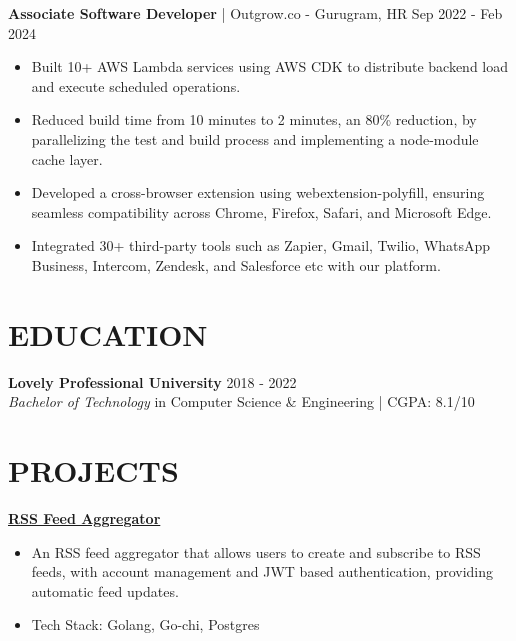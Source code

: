 \documentclass[]{resume}
\begin{document}
\textbf{Associate Software Developer} | Outgrow.co - Gurugram, HR \hfill Sep 2022 - Feb 2024
\begin{itemize}
    \item Built 10+ AWS Lambda services using AWS CDK to distribute backend load and execute scheduled operations.
    \item Reduced build time from 10 minutes to 2 minutes, an 80\% reduction, by parallelizing the test and build process and implementing a node-module cache layer.
    \item Developed a cross-browser extension using webextension-polyfill, ensuring seamless compatibility across Chrome, Firefox, Safari, and Microsoft Edge.
    \item Integrated 30+ third-party tools such as Zapier, Gmail, Twilio, WhatsApp Business, Intercom, Zendesk, and Salesforce etc with our platform.
\end{itemize}

\section{EDUCATION}
\textbf{Lovely Professional University}  \hfill 2018 - 2022 \\
\textit{Bachelor of Technology} in Computer Science \& Engineering | CGPA: 8.1/10

\section{PROJECTS}
\href{https://github.com/saswatax/rss-aggregator}{\textbf{RSS Feed Aggregator} \space\faExternalLink*}
\begin{itemize}
    \item An RSS feed aggregator that allows users to create and subscribe to RSS feeds, with account management and JWT based authentication, providing automatic feed updates.
    \item Tech Stack: Golang, Go-chi, Postgres
\end{itemize}
\end{document}
